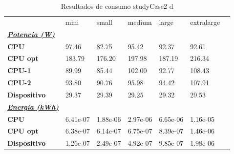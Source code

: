 \begin{table}[H]
    \centering
    \begin{tabular}{lllllll}
    \rowcolor[HTML]{DAE8FC} \ & mini & small & medium & 	large & 	extralarge \\
    \cellcolor[HTML]{DAE8FC} \textbf{\textbf{{\emph{{\underline{{Potencia (W)}}}}}}} &  &  &  & 	 & 	 \\
    \rowcolor[HTML]{EFEFEF} \cellcolor[HTML]{DAE8FC} \textbf{CPU} & 97.46 & 82.75 & 95.42 & 	92.37 & 	92.61 \\
    \cellcolor[HTML]{DAE8FC} \textbf{CPU opt} & 183.79 & 176.20 & 197.98 & 	187.19 & 	216.34 \\
    \rowcolor[HTML]{EFEFEF} \cellcolor[HTML]{DAE8FC} \textbf{\quad CPU-1} & 89.99 & 85.44 & 102.00 & 	92.77 & 	108.43 \\
    \cellcolor[HTML]{DAE8FC} \textbf{\quad CPU-2} & 93.80 & 90.76 & 95.98 & 	94.42 & 	107.91 \\
    \rowcolor[HTML]{EFEFEF} \cellcolor[HTML]{DAE8FC} \textbf{Dispositivo} & 29.37 & 29.39 & 29.25 & 	29.32 & 	29.53 \\
    \cellcolor[HTML]{DAE8FC} \textbf{\textbf{{\emph{{\underline{{Energía (kWh)}}}}}}} &  &  &  & 	 & 	 \\
    \rowcolor[HTML]{EFEFEF} \cellcolor[HTML]{DAE8FC} \textbf{CPU} & 6.41e-07 & 1.88e-06 & 2.97e-06 & 	6.65e-06 & 	1.16e-05 \\
    \cellcolor[HTML]{DAE8FC} \textbf{CPU opt} & 6.38e-07 & 6.14e-07 & 6.75e-07 & 	8.39e-07 & 	1.46e-06 \\
    \rowcolor[HTML]{EFEFEF} \cellcolor[HTML]{DAE8FC} \textbf{Dispositivo} & 1.26e-07 & 2.49e-07 & 4.92e-07 & 	9.85e-07 & 	1.98e-06 \\
    \end{tabular}
    \caption[Resultados de consumo studyCase2 d]{{Resultados de consumo studyCase2 d}}
    \label{table_test_studyCase2_d_hw_powerResults}
\end{table}